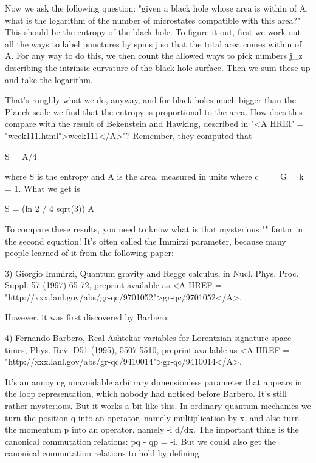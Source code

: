 Now we ask the following question: "given a black hole whose area is
within \epsilon  of A, what is the logarithm of the number of microstates
compatible with this area?"  This should be the entropy of the black
hole.  To figure it out, first we work out all the ways to label
punctures by spins j so that the total area comes within \epsilon  of A.
For any way to do this, we then count the allowed ways to pick numbers
j_{z} describing the intrinsic curvature of the black hole surface.  Then
we sum these up and take the logarithm.  

That's roughly what we do, anyway, and for black holes much bigger than
the Planck scale we find that the entropy is proportional to the area.
How does this compare with the result of Bekenstein and Hawking,
described in "<A HREF = "week111.html">week111</A>"?  Remember, they computed that

                           S = A/4

where S is the entropy and A is the area, measured in units where c =
\hbar  = G = k = 1.  What we get is 

                S = (ln 2 / 4 \pi  \gamma  sqrt(3)) A


 To compare these results, you need to know what is that mysterious
"\gamma " factor in the second equation!  It's often called the
Immirzi parameter, because many people learned of it from the following
paper:

3) Giorgio Immirzi, Quantum gravity and Regge calculus, in
Nucl. Phys. Proc. Suppl. 57 (1997) 65-72, preprint available as
<A HREF = "http://xxx.lanl.gov/abs/gr-qc/9701052">gr-qc/9701052</A>.

However, it was first discovered by Barbero: 

4) Fernando Barbero, Real Ashtekar variables for Lorentzian signature
space-times, Phys. Rev. D51 (1995), 5507-5510, preprint available as
<A HREF = "http://xxx.lanl.gov/abs/gr-qc/9410014">gr-qc/9410014</A>.

It's an annoying unavoidable arbitrary dimensionless parameter that
appears in the loop representation, which nobody had noticed before
Barbero.  It's still rather mysterious.  But it works a bit like this.
In ordinary quantum mechanics we turn the position q into an operator,
namely multiplication by x, and also turn the momentum p into an
operator, namely -i d/dx.  The important thing is the canonical
commutation relations: pq - qp = -i.  But we could also get the
canonical commutation relations to hold by defining

